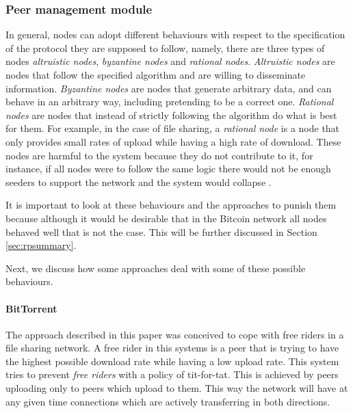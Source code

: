 

\subsubsection{Peer management module}
\label{sec:peer_management_module}


\label{sec:nodesbehaviour}
In general, nodes can adopt different behaviours with respect to the specification of the protocol they are supposed to follow, namely, there are three types of nodes \textit{altruistic nodes},  \textit{byzantine nodes} and \textit{rational nodes}. \textit{Altruistic nodes} are nodes that follow the specified algorithm and are willing to disseminate information. \textit{Byzantine nodes} are nodes that generate arbitrary data, and can behave in an arbitrary way, including pretending to be a correct one. \textit{Rational nodes} are nodes that instead of strictly following the algorithm do what is best for them. For example, in the case of file sharing, a \textit{rational node} is a node that only provides small rates of upload while having a high rate of download. These nodes are harmful to the system because they do not contribute to it, for instance, if all nodes were to follow the same logic there would not be enough seeders to support the network and the system would collapse \cite{li2006bar, cohen2003incentives}.

It is important to look at these behaviours and the approaches to punish them because although it would be desirable that in the Bitcoin network all nodes behaved well that is not the case. This will be further discussed in Section \ref{sec:rpsummary}.

Next, we discuss how some approaches deal with some of these possible behaviours.

\paragraph*{\textbf{BitTorrent} \cite{cohen2003incentives}}
The approach described in this paper was conceived to cope with free riders in a file sharing network. A free rider in this systems is a peer that is trying to have the highest possible download rate while having a low upload rate. This system tries to prevent \textit{free riders} with a policy of tit-for-tat. This is achieved by peers uploading only to peers which upload to them. This way the network will have at any given time connections which are actively transferring in both directions.

